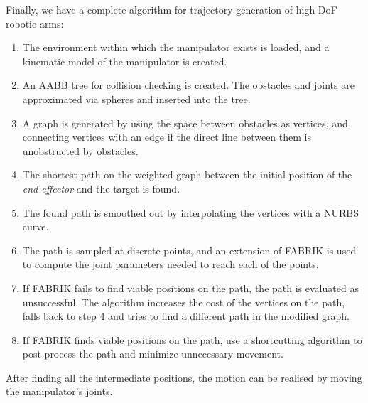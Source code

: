 Finally, we have a complete algorithm for trajectory generation of high DoF robotic arms:

\begin{enumerate}
\item The environment within which the manipulator exists is loaded, and a kinematic model of the manipulator is created.
\item An AABB tree for collision checking is created. The obstacles and joints are approximated via spheres and inserted into the tree.
\item A graph is generated by using the space between obstacles as vertices, and connecting vertices with an edge if the direct line between them is unobstructed by obstacles.
\item The shortest path on the weighted graph between the initial position of the \textit{end effector} and the target is found.
\item The found path is smoothed out by interpolating the vertices with a NURBS curve.
\item The path is sampled at discrete points, and an extension of FABRIK is used to compute the joint parameters needed to reach each of the points.
\item If FABRIK fails to find viable positions on the path, the path is evaluated as unsuccessful. The algorithm increases the cost of the vertices on the path, falls back to step 4 and tries to find a different path in the modified graph.
\item If FABRIK finds viable positions on the path, use a shortcutting algorithm to post-process the path and minimize unnecessary movement.
\end{enumerate}

After finding all the intermediate positions, the motion can be realised by moving the manipulator's joints.

